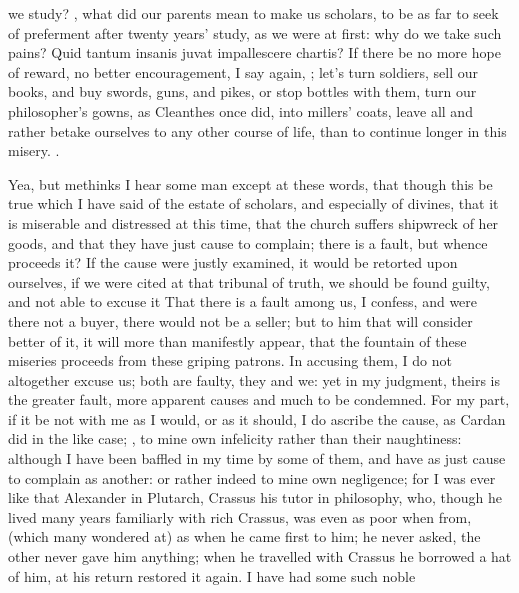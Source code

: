 {we study? , what did
our parents mean to make us scholars, to be as far to seek of
preferment after twenty years' study, as we were at first: why do we
take such pains? Quid tantum insanis juvat impallescere chartis? If
there be no more hope of reward, no better encouragement, I say again,
; let's turn soldiers,
sell our books, and buy swords, guns, and pikes, or stop bottles with
them, turn our philosopher's gowns, as Cleanthes once did, into
millers' coats, leave all and rather betake ourselves to any other
course of life, than to continue longer in this misery. .

Yea, but methinks I hear some man except at these words, that though
this be true which I have said of the estate of scholars, and
especially of divines, that it is miserable and distressed at this
time, that the church suffers shipwreck of her goods, and that they
have just cause to complain; there is a fault, but whence proceeds it?
If the cause were justly examined, it would be retorted upon ourselves,
if we were cited at that tribunal of truth, we should be found guilty,
and not able to excuse it That there is a fault among us, I confess,
and were there not a buyer, there would not be a seller; but to him
that will consider better of it, it will more than manifestly appear,
that the fountain of these miseries proceeds from these griping
patrons. In accusing them, I do not altogether excuse us; both are
faulty, they and we: yet in my judgment, theirs is the greater fault,
more apparent causes and much to be condemned. For my part, if it be
not with me as I would, or as it should, I do ascribe the cause, as
Cardan did in the like case; , to mine own infelicity rather than their naughtiness:
although I have been baffled in my time by some of them, and have as
just cause to complain as another: or rather indeed to mine own
negligence; for I was ever like that Alexander in Plutarch,
Crassus his tutor in philosophy, who, though he lived many years
familiarly with rich Crassus, was even as poor when from, (which many
wondered at) as when he came first to him; he never asked, the other
never gave him anything; when he travelled with Crassus he borrowed a
hat of him, at his return restored it again. I have had some such noble
}
